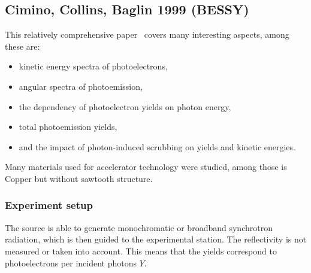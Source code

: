 
\subsection{Cimino, Collins, Baglin 1999 (BESSY)}
\label{sec:Cimino}

This relatively comprehensive paper~\cite{cimino} covers many interesting aspects, among these are:
\begin{itemize}
    \item kinetic energy spectra of photoelectrons,
    \item angular spectra of photoemission,
    \item the dependency of photoelectron yields on photon energy,
    \item total photoemission yields,
    \item and the impact of photon-induced scrubbing on yields and kinetic energies.
\end{itemize}
Many materials used for accelerator technology were studied, among those is Copper but without sawtooth structure.

\subsubsection{Experiment setup}

The source is able to generate monochromatic or broadband synchrotron radiation, which is then guided to the experimental station.
The reflectivity is not measured or taken into account.
This means that the yields correspond to photoelectrons per incident photons $Y$.

